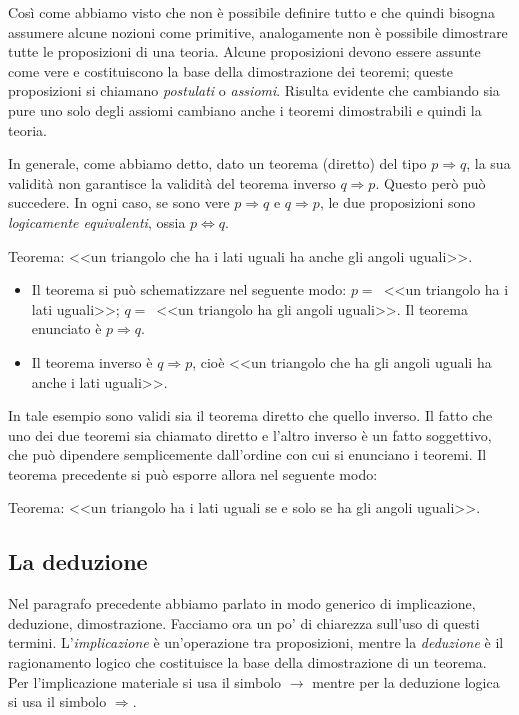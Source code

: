 Così come abbiamo visto che non è possibile definire tutto e che 
quindi bisogna assumere alcune nozioni come primitive, analogamente 
non è possibile dimostrare tutte le proposizioni di una teoria. 
Alcune proposizioni devono essere assunte come vere e costituiscono la 
base della dimostrazione dei teoremi; queste proposizioni si chiamano 
\emph{postulati} o \emph{assiomi}. Risulta evidente che cambiando sia 
pure uno solo degli assiomi cambiano anche i teoremi dimostrabili e 
quindi la teoria.

In generale, come abbiamo detto, dato un teorema (diretto) del tipo 
\(p\Rightarrow q\), la sua validità non garantisce la validità del 
teorema inverso \(q\Rightarrow p\). Questo però può succedere. In ogni 
caso, se sono vere \(p\Rightarrow q\) e \(q\Rightarrow p\), le due 
proposizioni sono \emph{logicamente equivalenti}, ossia 
\(p\Leftrightarrow q\).
\begin{exrig}
\begin{esempio}
Teorema: <<un triangolo che ha i lati uguali ha anche gli angoli 
uguali>>.
\begin{itemize}
\item Il teorema si può schematizzare nel seguente modo: \(p=\)~<<un 
triangolo ha i lati uguali>>; \(q=\)~<<un triangolo ha gli angoli 
uguali>>. Il teorema enunciato è \(p\Rightarrow q\).
\item  Il teorema inverso è  \(q\Rightarrow p\), cioè <<un triangolo 
che ha gli angoli uguali ha anche i lati uguali>>.
\end{itemize}
In tale esempio sono validi sia il teorema diretto che quello 
inverso. Il fatto che uno dei due teoremi sia chiamato diretto e 
l'altro inverso è un fatto soggettivo, che può dipendere 
semplicemente dall'ordine con cui si enunciano i teoremi.
Il teorema precedente si può esporre allora nel seguente modo:
\item Teorema: <<un triangolo ha i lati uguali se e solo se ha gli 
angoli uguali>>.
\end{esempio}
\end{exrig}

\subsection{La deduzione}

Nel paragrafo precedente abbiamo parlato in modo generico di 
implicazione, deduzione, dimostrazione. Facciamo ora un po' di 
chiarezza sull'uso di questi termini. L'\emph{implicazione} è 
un'operazione tra proposizioni, mentre la \emph{deduzione} è il 
ragionamento logico che costituisce la base della dimostrazione di un 
teorema. Per l'implicazione materiale si usa il simbolo \(\rightarrow\) 
mentre per la deduzione logica si usa il simbolo \(\Rightarrow\).

